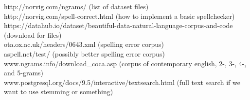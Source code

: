 \documentclass{article}
\begin{document}
http://norvig.com/ngrams/ (list of dataset files) \\

http://norvig.com/spell-correct.html (how to implement a basic spellchecker) \\

https://datahub.io/dataset/beautiful-data-natural-language-corpus-and-code (download for files) \\

ota.ox.ac.uk/headers/0643.xml (spelling error corpus) \\

aspell.net/test/ (possibly better spelling error corpus) \\

www.ngrams.info/download\_coca.asp (corpus of contemporary english, 2-, 3-, 4-, and 5-grams) \\

www.postgresql.org/docs/9.5/interactive/textsearch.html (full text search if we want to use stemming or something) \\
\end{document}
